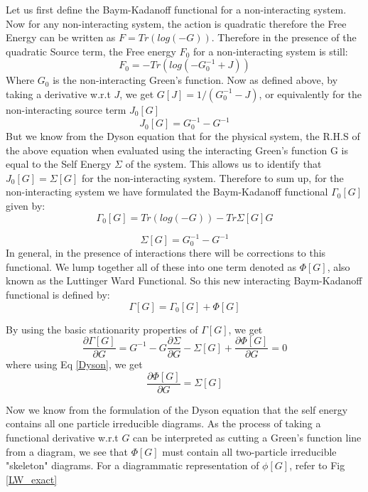 \documentclass[10pt]{ruthesis}
\begin{document}
 Let us first define the Baym-Kadanoff functional for a non-interacting system. Now for any non-interacting system, the action is quadratic therefore the Free Energy can be written as $F=Tr(log(-G))$. Therefore in the presence of the quadratic Source term, the Free energy $F_0$ for a non-interacting system is still:
 \begin{equation}
 F_{0}= -Tr(log(-G_0^{-1} +J))
 \end{equation}
Where $G_{0}$ is the non-interacting Green's function. Now as defined above, by taking a derivative w.r.t $ J$, we get $G[J]= 1/ (G_0^{-1} -J)$, or equivalently for the non-interacting source term $J_0[G]$
\begin{equation}
 J_0[G]=G_0^{-1}- G^{-1}
 \end{equation} 
But we know from the Dyson equation that for the physical system, the R.H.S of the above equation when evaluated using the interacting Green's function G is equal to the Self Energy $\Sigma$ of the system. This allows us to identify that $J_0[G]=\Sigma[G]$ for the non-interacting system. Therefore to sum up, for the non-interacting system we have formulated the Baym-Kadanoff functional $\Gamma_0[G]$ given by:
\begin{equation}
\Gamma_0[G]= Tr(log(-G)) -Tr \Sigma[G]G
\end{equation}
 
\begin{equation}\label{Dyson}
 \Sigma[G]= G_0^{-1}- G^{-1}
\end{equation}
In general, in the presence of interactions there will be corrections to this functional. We lump together all of these into one term denoted as $\Phi[G]$, also known as the Luttinger Ward Functional. So this new interacting Baym-Kadanoff functional is defined by:
\begin{equation}
\Gamma[G]=\Gamma_0[G]+\Phi[G]
\end{equation}

By using the basic stationarity properties of $\Gamma[G]$, we get
\begin{equation}
\dfrac{\partial \Gamma[G]}{\partial G}= G^{-1} -G \dfrac{\partial \Sigma}{\partial G} -\Sigma[G] +\dfrac{\partial \Phi[G]}{\partial G}=0
\end{equation}
 where using Eq \ref{Dyson}, we get
 \begin{equation}\label{Luttinger-Sigma}
 \dfrac{\partial \Phi[G]}{\partial G}=\Sigma[G]
 \end{equation}
 
 Now we know from the formulation of the Dyson equation that the self energy contains all one particle irreducible diagrams. As the process of taking a functional derivative w.r.t $G$ can be interpreted as cutting a Green's function line from a diagram, we see that $\Phi[G]$ must contain all two-particle irreducible "skeleton" diagrams. For a diagrammatic representation of $\phi[G]$, refer to Fig \ref{LW_exact} 
\end{document}
